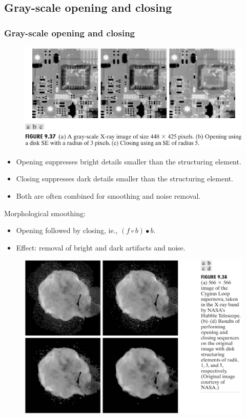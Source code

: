 \subsection{Gray-scale opening and closing}


\begin{frame}
\frametitle{Gray-scale opening and closing}
\begin{figure}[!h]
\includegraphics[width=\textwidth]{fig-9-37.png}
\end{figure}
\end{frame}

\begin{frame}
\begin{itemize}
\item Opening suppresses bright details smaller than the structuring element.
\item Closing suppresses dark details smaller than the structuring element.
\item Both are often combined for smoothing and noise removal.
\end{itemize}
\end{frame}

\begin{frame}
Morphological smoothing:
\begin{itemize}
\item Opening followed by closing, ie., $(f \circ b) \bullet b$.
\item Effect: removal of bright and dark artifacts and noise.
\end{itemize}
\begin{figure}[!h]
\includegraphics[width=.6\textwidth]{fig-9-38.png}
\end{figure}
\end{frame}

